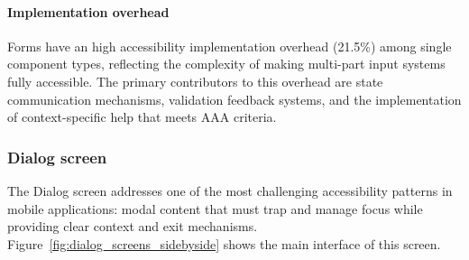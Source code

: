 \paragraph{Implementation overhead}

Forms have an high accessibility implementation overhead (21.5\%) among single component types, reflecting the complexity of making multi-part input systems fully accessible. The primary contributors to this overhead are state communication mechanisms, validation feedback systems, and the implementation of context-specific help that meets AAA criteria.

\subsubsection{Dialog screen}
\label{subsubsec:dialogs-screen}

The Dialog screen addresses one of the most challenging accessibility patterns in mobile applications: modal content that must trap and manage focus while providing clear context and exit mechanisms. Figure~\ref{fig:dialog_screens_sidebyside} shows the main interface of this screen.

